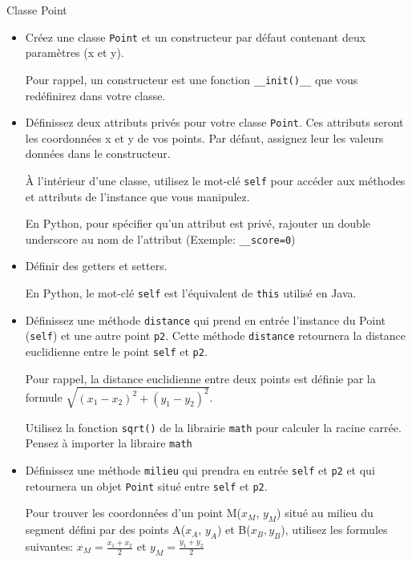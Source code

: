 \begin{Exercice}[15 minutes] Classe Point
    \begin{itemize}
        \item Créez une classe \lstinline{Point} et un constructeur par défaut contenant deux paramètres (x et y).
        \begin{conseil}
            Pour rappel, un constructeur est une fonction \lstinline{__init()__} que vous redéfinirez dans votre classe.
        \end{conseil}
        \item Définissez deux attributs privés pour votre classe \lstinline{Point}. Ces attributs seront les coordonnées x et y de vos points. Par défaut, assignez leur les valeurs données dans le constructeur.
        \begin{conseil}
            À l'intérieur d'une classe, utilisez le mot-clé \lstinline{self} pour accéder aux méthodes et attributs de l'instance que vous manipulez.

            En Python, pour spécifier qu'un attribut est privé, rajouter un double underscore au nom de l'attribut (Exemple: \lstinline{__score=0})
        \end{conseil}
        \item Définir des getters et setters.
        \begin{conseil}
            En Python, le mot-clé \lstinline{self} est l'équivalent de \lstinline{this} utilisé en Java.
        \end{conseil}
        \item Définissez une méthode \lstinline{distance} qui prend en entrée l'instance du Point (\lstinline{self}) et une autre point \lstinline{p2}. Cette méthode \lstinline{distance} retournera la distance euclidienne entre le point \lstinline{self} et \lstinline{p2}. 
        \begin{conseil}
            Pour rappel, la distance euclidienne entre deux points est définie par la formule $\sqrt{(x_1 - x_2)^2 + (y_1 - y_2)^2}$.

            Utilisez la fonction \lstinline{sqrt()} de la librairie \lstinline{math} pour calculer la racine carrée. Pensez à importer la libraire \lstinline{math}
        \end{conseil}
        \item Définissez une méthode \lstinline{milieu} qui prendra en entrée \lstinline{self} et \lstinline{p2} et qui retournera un objet \lstinline{Point} situé entre \lstinline{self} et \lstinline{p2}.
        \begin{conseil}
            Pour trouver les coordonnées d'un point M($x_M$, $y_M$) situé au milieu du segment défini par des points A($x_A$, $y_A$) et B($x_B, y_B$),
            utilisez les formules suivantes:
            $x_M = \frac{x_1 + x_2}{2}$ et $y_M = \frac{y_1 + y_2}{2}$
        \end{conseil}


\end{itemize}
\end{Exercice}
